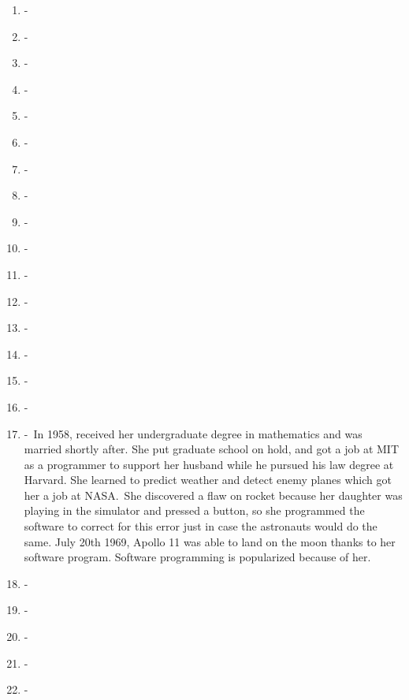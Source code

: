 \documentclass[12pt,a4paper]{article}
\begin{document}
\begin{enumerate}
  \item {} -\ 
  \item {} -\
  \item {} -\
  \item {} -\
  \item {} -\
  \item {} -\
  \item {} -\
  \item {} -\
  \item {} -\
  \item {} -\
  \item {} -\
  \item {} -\
  \item {} -\
  \item {} -\
  \item {} -\
  \item {} -\
  \item {} -\ In 1958, received her undergraduate degree in mathematics and was married shortly after. She put graduate school on hold, and got a job at MIT as a programmer to support her husband while he pursued his law degree at Harvard. She learned to predict weather and detect enemy planes which got her a job at NASA.\ She discovered a flaw on rocket because her daughter was playing in the simulator and pressed a button, so she programmed the software to correct for this error just in case the astronauts would do the same. July 20th 1969, Apollo 11 was able to land on the moon thanks to her software program. Software programming is popularized because of her. 
  \item \imp{Sally Ride} -\
  \item {} -\
  \item {} -\
  \item {} -\
  \item {} -\

\end{enumerate}
\end{document}
